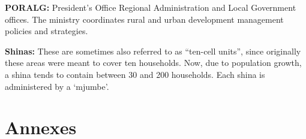 \documentclass[a4paper,12pt,twoside]{article}
\begin{document}
\textbf{PORALG:} President's Office Regional Administration and Local Government offices. The ministry coordinates rural and urban development management policies and strategies.


\textbf{Shinas:} These are sometimes also referred to as “ten-cell units”, since originally these areas were meant to cover ten households. Now, due to population growth, a shina tends to contain between 30 and 200 households. Each shina is administered by a ‘mjumbe’.

\section{Annexes}
\end{document}
